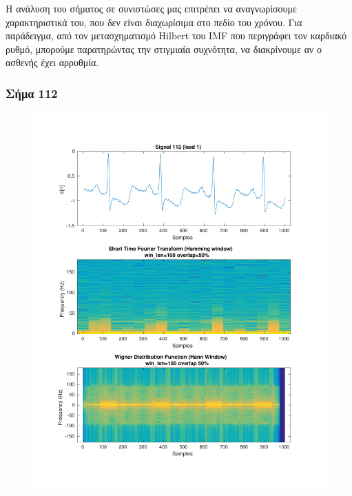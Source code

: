 \documentclass[11pt,a4paper]{article}
\begin{document}
Η ανάλυση του σήματος σε συνιστώσες μας επιτρέπει να αναγνωρίσουμε χαρακτηριστικά του, που δεν είναι διαχωρίσιμα στο πεδίο του χρόνου. Για παράδειγμα, από τον μετασχηματισμό Hilbert του IMF που περιγράφει τον καρδιακό ρυθμό, μπορούμε παρατηρώντας την στιγμιαία συχνότητα, να διακρίνουμε αν ο ασθενής έχει αρρυθμία.


\subsubsection*{Σήμα 112}

\begin{figure}[H]
\centering
\begin{minipage}{0.48\textwidth}
	\centering
	\includegraphics[width=\textwidth]{fig/112l1_stft_wdf.pdf}
\end{minipage}
\begin{minipage}{0.48\textwidth}
	\centering

\end{minipage}
\end{figure}
\end{document}
